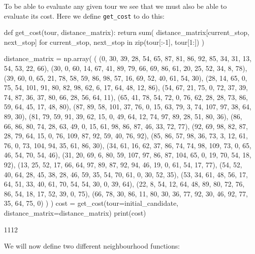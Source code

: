 \begin{pyout}
[0, 2, 7, 9, 10, 14, 5, 3, 15, 11, 8, 17, 12, 4, 1, 6, 16, 13, 0]
\end{pyout}

To be able to evaluate any given tour we see that we must also be able to
evaluate its cost. Here we define \texttt{get_cost} to do this:

\begin{pyin}
def get_cost(tour, distance_matrix):
    return sum(
        distance_matrix[current_stop, next_stop]
        for current_stop, next_stop in
        zip(tour[:-1], tour[1:])
    )
\end{pyin}

\begin{pyin}
distance_matrix = np.array(
    (
    (0, 30, 39, 28, 54, 65, 87, 81, 86, 92, 85, 34, 31, 13, 54, 53, 22, 66),
    (30, 0, 60, 14, 67, 41, 89, 79, 66, 69, 86, 61, 20, 25, 52, 34, 8, 78),
    (39, 60, 0, 65, 21, 78, 58, 59, 86, 98, 57, 16, 69, 52, 40, 61, 54, 30),
    (28, 14, 65, 0, 75, 54, 101, 91, 80, 82, 98, 62, 6, 17, 64, 48, 12, 86),
    (54, 67, 21, 75, 0, 72, 37, 39, 74, 87, 36, 37, 80, 66, 28, 56, 64, 11),
    (65, 41, 78, 54, 72, 0, 76, 62, 28, 28, 73, 86, 59, 64, 45, 17, 48, 80),
    (87, 89, 58, 101, 37, 76, 0, 15, 63, 79, 3, 74, 107, 97, 38, 64, 89, 30),
    (81, 79, 59, 91, 39, 62, 15, 0, 49, 64, 12, 74, 97, 89, 28, 51, 80, 36),
    (86, 66, 86, 80, 74, 28, 63, 49, 0, 15, 61, 98, 86, 87, 46, 33, 72, 77),
    (92, 69, 98, 82, 87, 28, 79, 64, 15, 0, 76, 109, 87, 92, 59, 40, 76, 92),
    (85, 86, 57, 98, 36, 73, 3, 12, 61, 76, 0, 73, 104, 94, 35, 61, 86, 30),
    (34, 61, 16, 62, 37, 86, 74, 74, 98, 109, 73, 0, 65, 46, 54, 70, 54, 46),
    (31, 20, 69, 6, 80, 59, 107, 97, 86, 87, 104, 65, 0, 19, 70, 54, 18, 92),
    (13, 25, 52, 17, 66, 64, 97, 89, 87, 92, 94, 46, 19, 0, 61, 54, 17, 77),
    (54, 52, 40, 64, 28, 45, 38, 28, 46, 59, 35, 54, 70, 61, 0, 30, 52, 35),
    (53, 34, 61, 48, 56, 17, 64, 51, 33, 40, 61, 70, 54, 54, 30, 0, 39, 64),
    (22, 8, 54, 12, 64, 48, 89, 80, 72, 76, 86, 54, 18, 17, 52, 39, 0, 75),
    (66, 78, 30, 86, 11, 80, 30, 36, 77, 92, 30, 46, 92, 77, 35, 64, 75, 0)
    )
)
cost = get_cost(tour=initial_candidate, distance_matrix=distance_matrix)
print(cost)
\end{pyin}

\begin{pyout}
1112
\end{pyout}

We will now define two different neighbourhood functions:

